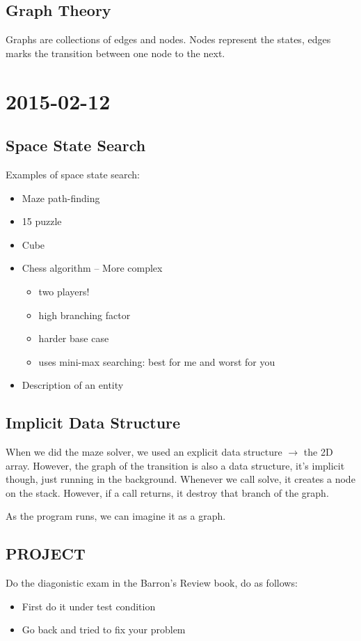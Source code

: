 \documentclass [12 pt, twoside] {article}
\begin{document}
\subsection{Graph Theory}

Graphs are collections of edges and nodes. Nodes represent the states, edges marks the transition between one node to the next.


\section{2015-02-12}
\subsection{Space State Search}
Examples of space state search:
\begin{itemize}
	\item Maze path-finding
	\item 15 puzzle
	\item Cube
	\item Chess algorithm -- More complex
		\begin{itemize}
			\item two players!
			\item high branching factor
			\item harder base case
			\item uses mini-max searching: best for me and worst for you
		\end{itemize}
	\item Description of an entity
\end{itemize}

\subsection{Implicit Data Structure}

When we did the maze solver, we used an explicit data structure $\to$ the 2D array.
However, the graph of the transition is also a data structure, it's implicit though,
just running in the background. Whenever we call solve, it creates a node on the
stack. However, if a call returns, it destroy that branch of the graph.

As the program runs, we can imagine it as a graph.

\subsection{PROJECT}
Do the diagonistic exam in the Barron's Review book, do as follows:
\begin{itemize}
	\item First do it under test condition
	\item Go back and tried to fix your problem
\end{itemize}
\end{document}
